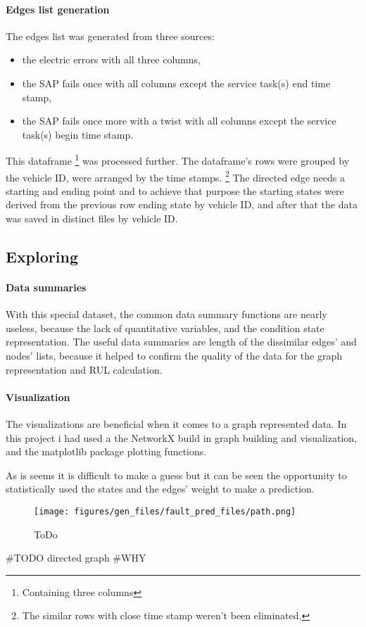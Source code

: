 \paragraph{Edges list generation}
The edges list was generated from three sources: 
\begin{itemize}
	\item{the electric errors} with all three columns,
	\item{the SAP fails once} with all columns except the service task(s) end time stamp,
	\item{the SAP fails once more with a twist} with all columns except the service task(s) begin time stamp.
\end{itemize}

This dataframe \footnote{Containing three columns} was processed further. The dataframe's rows were grouped by the vehicle ID, were arranged by the time stamps.
\footnote{The similar rows with close time stamp weren't been eliminated.}
The directed edge needs a starting and ending point and to achieve that purpose the starting states were derived from the previous row ending state by vehicle ID, and after that the data was saved in distinct files by vehicle ID.
	\subsection{Exploring}
		\paragraph{Data summaries}
		With this special dataset, the common data summary functions are nearly useless, because the lack of quantitative variables, and the condition state representation.
		The useful data summaries are length of the dissimilar edges' and nodes' lists, because it helped to confirm the quality of the data for the graph representation and RUL calculation. 

		\paragraph{Visualization}
		The visualizations are beneficial when it comes to a graph represented data. In this project i had used a the NetworkX build in graph building and visualization, and the matplotlib package plotting functions.

		As is seems it is difficult to make a guess but it can be seen the opportunity to statistically used the states and the edges' weight to make a prediction.
			\begin{figure}[H]
			\centering
			\texttt{[image: figures/gen\_files/fault\_pred\_files/path.png]}
			\caption{ToDo} 
			\end{figure}
		\#TODO directed graph
\#WHY

